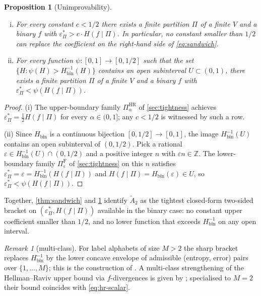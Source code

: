 \documentclass[10pt]{article}
\newtheorem{proposition}[theorem]{Proposition}
\theoremstyle{definition}
\theoremstyle{remark}
\newtheorem{remark}[theorem]{Remark}
\newcommand{\Hbin}{H_{\mathrm{bin}}}
\newcommand{\Hinv}{H_{\mathrm{bin}}^{-1}}
\newcommand{\eps}{\varepsilon}
\newcommand{\epsP}{\eps^{\!*}_{\Pi}}
\newcommand{\Atilde}{\widetilde{A}_{2}}
\begin{document}
\begin{proposition}[Unimprovability]\label{prop:sharp}\hfill
\begin{enumerate}[(i)]
  \item For every constant $c < 1/2$ there exists a finite
    partition $\Pi$ of a finite $V$ and a binary $f$ with
    $\epsP > c \cdot H(f \mid \Pi)$. In particular, no constant
    smaller than $1/2$ can replace the coefficient on the
    right-hand side of \eqref{eq:sandwich}.
  \item For every function $\psi : [0, 1] \to [0, 1/2]$ such that
    the set $\{H : \psi(H) > \Hinv(H)\}$ contains an open
    subinterval $U \subset (0, 1)$, there exists a finite
    partition $\Pi$ of a finite $V$ and a binary $f$ with
    $\epsP < \psi(H(f \mid \Pi))$.
\end{enumerate}
\end{proposition}

\begin{proof}
(i) The upper-boundary family $\Pi^{\mathrm{HR}}_{\alpha}$ of
\cref{sec:tightness} achieves $\epsP = \tfrac{1}{2}H(f\mid\Pi)$
for every $\alpha \in (0, 1]$; any $c < 1/2$ is witnessed by such
a row.

(ii) Since $\Hbin$ is a continuous bijection
$[0, 1/2] \to [0, 1]$, the image $\Hbin^{-1}(U)$ contains an
open subinterval of $(0, 1/2)$. Pick a rational
$\eps \in \Hbin^{-1}(U) \cap (0, 1/2)$ and a positive integer
$n$ with $\eps n \in \mathbb{Z}$. The lower-boundary family
$\Pi^{\mathrm{F}}_{\eps}$ of \cref{sec:tightness} on this $n$
satisfies $\epsP = \eps = \Hinv(H(f \mid \Pi))$ and
$H(f \mid \Pi) = \Hbin(\eps) \in U$, so $\epsP < \psi(H(f \mid \Pi))$.
\end{proof}

Together, \cref{thm:sandwich} and \cref{prop:sharp} identify
$\Atilde$ as the tightest closed-form two-sided bracket on
$(\epsP, H(f \mid \Pi))$ available in the binary case: no constant
upper coefficient smaller than $1/2$, and no lower function that
exceeds $\Hinv$ on any open interval.

\begin{remark}[multi-class]
For label alphabets of size $M > 2$ the sharp bracket replaces
$\Hinv$ by the lower concave envelope of admissible
(entropy, error) pairs over $\{1, \ldots, M\}$; this is the
construction of \citet{feder1994}. A multi-class strengthening
of the Hellman--Raviv upper bound via $f$-divergences is given
by \citet{hashlamoun1994}; specialised to $M = 2$ their bound
coincides with \eqref{eq:hr-scalar}.
\end{remark}
\end{document}
